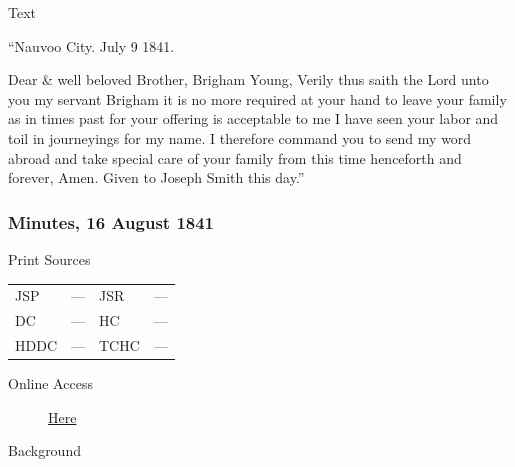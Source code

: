			\begin{description}
				\item[Text]
			\end{description}
			
				\begin{tightright}
					``Nauvoo City. July 9 1841.
				\end{tightright}
				
				Dear \& well beloved Brother, Brigham Young, Verily thus saith the Lord unto you my servant Brigham it is no more required at your hand to leave your family as in times past for your offering is acceptable to me I have seen your labor and toil in journeyings for my name. I therefore command you to send my word abroad and take special care of your family from this time henceforth and forever, Amen. Given to Joseph Smith this day.''
				
		\subsubsection{Minutes, 16 August 1841}
			\label{EMS-1841-JS-16-AUG-1841}
				
			\begin{description}
				\item[Print Sources]
			\end{description}

			\begin{tabular}{p{0.5in}p{1in}p{0.5in}p{1in}}
				JSP	 	& ---		& JSR 		& --- \\
				DC	 	& ---		& HC 		& --- \\
				HDDC 	& ---		& TCHC 		& --- \\
			\end{tabular}
			
			\begin{description}
				\item[Online Access] \href{https://www.josephsmithpapers.org/paper-summary/minutes-16august-1841/1}{Here}
			\end{description}
			
			\begin{description}
				\item[Background]
			\end{description}
			
